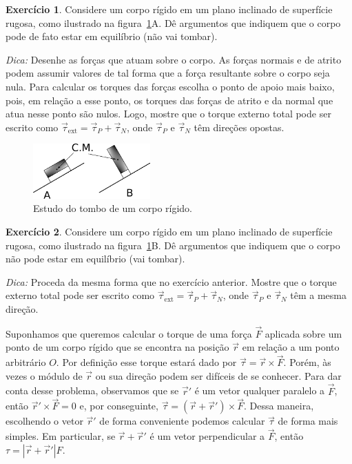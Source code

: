 \documentclass[papersize=a4,DIV=calc,twocolumn=on]{scrartcl}
\theoremstyle{definition}
\newtheorem{ex}{Exercício}[section]
\begin{document}
\begin{ex}
  Considere um corpo rígido em um plano inclinado de superfície
  rugosa, como ilustrado na figura~\ref{fig:tombo}A. Dê argumentos que
  indiquem que o corpo pode de fato estar em equilíbrio (não vai
  tombar).

  \noindent\textit{Dica:} Desenhe as forças que atuam sobre o
  corpo. As forças normais e de atrito podem assumir valores de tal
  forma que a força resultante sobre o corpo seja nula. Para calcular
  os torques das forças escolha o ponto de apoio mais baixo, pois, em
  relação a esse ponto, os torques das forças de atrito e da normal
  que atua nesse ponto são nulos. Logo, mostre que o torque externo
  total pode ser escrito como
  $\vec \tau_{\mathrm{ext}}=\vec\tau_P+\vec\tau_N$, onde $\vec\tau_P$
  e $\vec\tau_N$ têm direções opostas.
  \begin{figure}[ht]
    \centering
    \includegraphics[width=0.4\textwidth,keepaspectratio]{tombo.pdf}
    \caption{Estudo do tombo de um corpo rígido.}
    \label{fig:tombo}
  \end{figure}
\end{ex}

\begin{ex}
  Considere um corpo rígido em um plano inclinado de superfície
  rugosa, como ilustrado na figura~\ref{fig:tombo}B. Dê argumentos que
  indiquem que o corpo não pode estar em equilíbrio (vai tombar).

  \noindent\textit{Dica:} Proceda da mesma forma que no exercício
  anterior. Mostre que o torque externo total pode ser escrito como
  $\vec\tau_{\mathrm{ext}}=\vec\tau_P+\vec\tau_N$, onde $\vec\tau_P$ e
  $\vec\tau_N$ têm a mesma direção.
\end{ex}

Suponhamos que queremos calcular o torque de uma força $\vec F$
aplicada sobre um ponto de um corpo rígido que se encontra na posição
$\vec r$ em relação a um ponto arbitrário $O$. Por definição esse
torque estará dado por $\vec\tau=\vec r\times\vec F$. Porém, às vezes
o módulo de $\vec r$ ou sua direção podem ser difíceis de se
conhecer. Para dar conta desse problema, observamos que se $\vec r'$ é
um vetor qualquer paralelo a $\vec F$, então $\vec r'\times\vec F=0$
e, por conseguinte, $\vec\tau=(\vec r+\vec r')\times \vec F$. Dessa
maneira, escolhendo o vetor $\vec r'$ de forma conveniente podemos
calcular $\vec\tau$ de forma mais simples. Em particular, se
$\vec r+\vec r'$ é um vetor perpendicular a $\vec F$, então
$\tau=|\vec r+\vec r'|F$.
\end{document}
